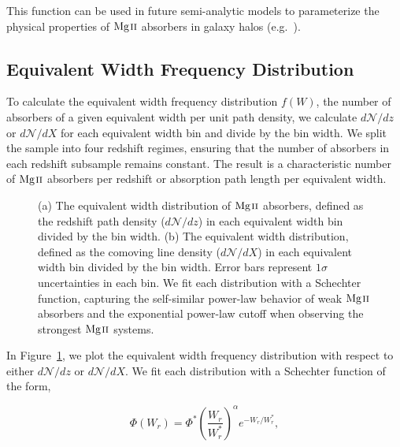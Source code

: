 \documentclass[iop,apj,numberedappendix,appendixfloats,twocolappendix]{emulateapj}
\begin{document}
\noindent This function can be used in future semi-analytic models to parameterize the physical properties of ${\hbox{{\rm Mg}\kern 0.1em{\sc ii}}}$ absorbers in galaxy halos (e.g.~\cite{Shattow2015}).


\subsection{Equivalent Width Frequency Distribution}
\label{sec:ewdistro}

To calculate the equivalent width frequency distribution $f(W)$, the number of absorbers of a given equivalent width per unit path density, we calculate $d\mathcal{N}\!/dz$ or $d\mathcal{N}\!/dX$ for each equivalent width bin and divide by the bin width. We split the sample into four redshift regimes, ensuring that the number of absorbers in each redshift subsample remains constant. The result is a characteristic number of ${\hbox{{\rm Mg}\kern 0.1em{\sc ii}}}$ absorbers per redshift or absorption path length per equivalent width.

\begin{figure*}[bth]
\caption{(a) The equivalent width distribution of ${\hbox{{\rm Mg}\kern 0.1em{\sc ii}}}$ absorbers, defined as the redshift path density ($d\mathcal{N}\!/dz$) in each equivalent width bin divided by the bin width. (b) The equivalent width distribution, defined as the comoving line density ($d\mathcal{N}\!/dX$) in each equivalent width bin divided by the bin width. Error bars represent $1\sigma$ uncertainties in each bin. We fit each distribution with a Schechter function, capturing the self-similar power-law behavior of weak ${\hbox{{\rm Mg}\kern 0.1em{\sc ii}}}$ absorbers and the exponential power-law cutoff when observing the strongest ${\hbox{{\rm Mg}\kern 0.1em{\sc ii}}}$ systems.}
\label{fig:ewdistro}
\end{figure*}

In Figure~\ref{fig:ewdistro}, we plot the equivalent width frequency distribution with respect to either $d\mathcal{N}\!/dz$ or $d\mathcal{N}\!/dX$. We fit each distribution with a Schechter function of the form,

\begin{equation}
\Phi (W_r) = \Phi^* \left(\frac{W_r}{W_r^*}\right)^{\alpha} e^{-W_r / W_r^*} ,
\label{eqn:schechter}
\end{equation}
\end{document}
